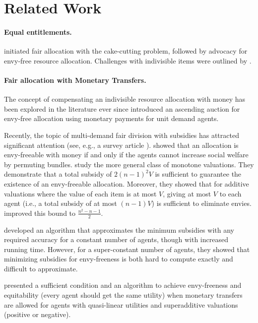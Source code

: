 \section{Related Work}
\label{sec:related_work}
 \paragraph{\textbf{Equal entitlements.}}
 \cite{steinhaus1948problem} initiated fair allocation with the cake-cutting problem, followed by \cite{foley1966resource} advocacy for envy-free resource allocation. Challenges with indivisible items were outlined by \cite{schmeidler1971fair}. 
 
 \paragraph{\textbf{Fair allocation with Monetary Transfers.}}
 The concept of compensating an indivisible resource allocation with money has been explored in the literature ever since 
 \cite{demange1986multi} introduced an ascending auction for envy-free allocation using monetary payments for unit demand agents.
 
 Recently, the topic of multi-demand fair division with subsidies has attracted significant attention (see, e.g., a survey article \cite{LLSW24}).
 \cite{HaSh19a} showed that
 an allocation is envy-freeable with money if and only if the agents cannot increase
 social welfare by permuting bundles.
 \cite{Brustle2020} study the more general class of monotone valuations. They demonstrate that a total subsidy of $2(n-1)^2   V$ is sufficient to guarantee the existence of an envy-freeable allocation. Moreover, they showed that 
 for additive valuations where the value of each item is at most $V$,
 giving at most $V$ to each agent (i.e., a total subsidy of at most $(n-1)V$) is sufficient to eliminate envies.
 \cite{kawase2024towards} improved this bound to $\frac{n^2 - n - 1}{2}$.
 
 \cite{caragiannis2020computing} developed an algorithm that approximates the minimum subsidies with any required accuracy for a constant number of agents, though with increased running time. However, for a super-constant number of agents, they showed that minimizing subsidies for envy-freeness is both hard to compute exactly and difficult to approximate.
 
 \cite{Aziz21a} presented a sufficient condition and an algorithm to achieve envy-freeness and equitability (every agent should get the same utility) when monetary transfers are allowed for agents with quasi-linear utilities and superadditive valuations (positive or negative).
 

